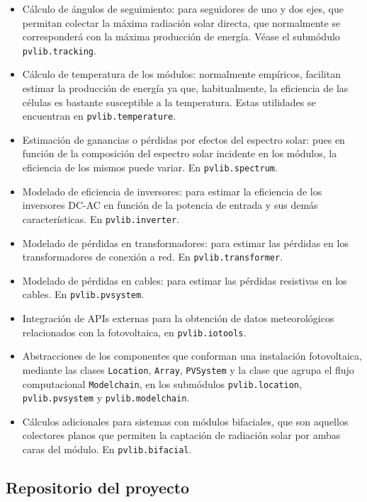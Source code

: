\begin{itemize}
    \item Cálculo de ángulos de seguimiento: para seguidores de uno y dos ejes, que permitan colectar la máxima radiación solar \gls{directa}, que normalmente se corresponderá con la máxima producción de energía. Véase el submódulo \texttt{pvlib.tracking}.
    \item Cálculo de temperatura de los módulos: normalmente empíricos, facilitan estimar la producción de energía ya que, habitualmente, la eficiencia de las células es bastante susceptible a la temperatura. Estas utilidades se encuentran en \texttt{pvlib.temperature}.
    \item Estimación de ganancias o pérdidas por efectos del espectro solar: pues en función de la composición del espectro solar incidente en los módulos, la eficiencia de los mismos puede variar. En \texttt{pvlib.spectrum}.
    \item Modelado de eficiencia de inversores: para estimar la eficiencia de los \gls{inversores} DC-AC en función de la potencia de entrada y sus demás características. En \texttt{pvlib.inverter}.
    \item Modelado de pérdidas en transformadores: para estimar las pérdidas en los \gls{transformadores} de conexión a red. En \texttt{pvlib.transformer}.
    \item Modelado de pérdidas en cables: para estimar las pérdidas resistivas en los cables. En \texttt{pvlib.pvsystem}.
    \item Integración de APIs externas para la obtención de datos meteorológicos relacionados con la fotovoltaica, en \texttt{pvlib.iotools}.
    \item Abstracciones de los componentes que conforman una instalación fotovoltaica, mediante las clases \texttt{Location}, \texttt{Array}, \texttt{PVSystem} y la clase que agrupa el flujo computacional \texttt{Modelchain}, en los submódulos \texttt{pvlib.location}, \texttt{pvlib.pvsystem} y \texttt{pvlib.modelchain}.
    \item Cálculos adicionales para sistemas con \gls{módulos bifaciales}, que son aquellos \gls{colectores} planos que permiten la captación de radiación solar por ambas caras del módulo. En \texttt{pvlib.bifacial}.

\end{itemize}

\subsection{Repositorio del proyecto} \label{ssct:pvlib:repositorio}

